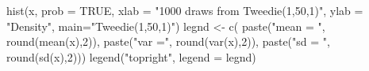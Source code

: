 \begin{Schunk}
\begin{Sinput}
  hist(x, prob = TRUE, xlab = "1000 draws from Tweedie(1,50,1)", ylab = "Density", main="Tweedie(1,50,1)")
  legnd <- c( paste("mean = ", round(mean(x),2)), paste("var =", round(var(x),2)), paste("sd = ", round(sd(x),2)))
  legend("topright", legend = legnd)
\end{Sinput}
\end{Schunk}
